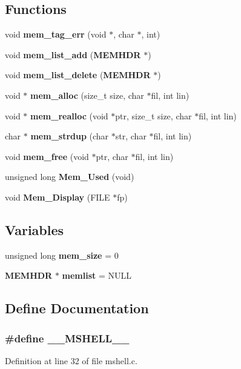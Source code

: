 \subsection*{Functions}
\begin{CompactItemize}
\item 
void {\bf mem\_\-tag\_\-err} (void $\ast$, char $\ast$, int)
\item 
void {\bf mem\_\-list\_\-add} ({\bf MEMHDR} $\ast$)
\item 
void {\bf mem\_\-list\_\-delete} ({\bf MEMHDR} $\ast$)
\item 
void $\ast$ {\bf mem\_\-alloc} (size\_\-t size, char $\ast$fil, int lin)
\item 
void $\ast$ {\bf mem\_\-realloc} (void $\ast$ptr, size\_\-t size, char $\ast$fil, int lin)
\item 
char $\ast$ {\bf mem\_\-strdup} (char $\ast$str, char $\ast$fil, int lin)
\item 
void {\bf mem\_\-free} (void $\ast$ptr, char $\ast$fil, int lin)
\item 
unsigned long {\bf Mem\_\-Used} (void)
\item 
void {\bf Mem\_\-Display} (FILE $\ast$fp)
\end{CompactItemize}
\subsection*{Variables}
\begin{CompactItemize}
\item 
unsigned long {\bf mem\_\-size} = 0
\item 
{\bf MEMHDR} $\ast$ {\bf memlist} = NULL
\end{CompactItemize}


\subsection{Define Documentation}
\subsubsection{\setlength{\rightskip}{0pt plus 5cm}\#define \_\-\_\-MSHELL\_\-\_\-}\label{mshell_8c_a0}




Definition at line 32 of file mshell.c.
